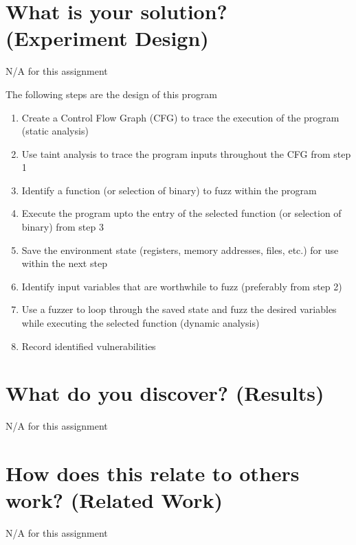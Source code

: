 \documentclass[conference]{IEEEtran}
\begin{document}
\section{What is your solution? (Experiment Design)}
N/A for this assignment

The following steps are the design of this program
\begin{enumerate}
\item Create a Control Flow Graph (CFG) to trace the execution of the program (static analysis)
\item Use taint analysis to trace the program inputs throughout the CFG from step 1
\item Identify a function (or selection of binary) to fuzz within the program
\item Execute the program upto the entry of the selected function (or selection of binary) from step 3 
\item Save the environment state (registers, memory addresses, files, etc.) for use within the next step
\item Identify input variables that are worthwhile to fuzz (preferably from step 2)
\item Use a fuzzer to loop through the saved state and fuzz the desired variables while executing the selected function (dynamic analysis)
\item Record identified vulnerabilities
\end{enumerate}


\section{What do you discover? (Results)}
N/A for this assignment

\section{How does this relate to others work? (Related Work)}
N/A for this assignment

\nocite{*}


\end{document}
